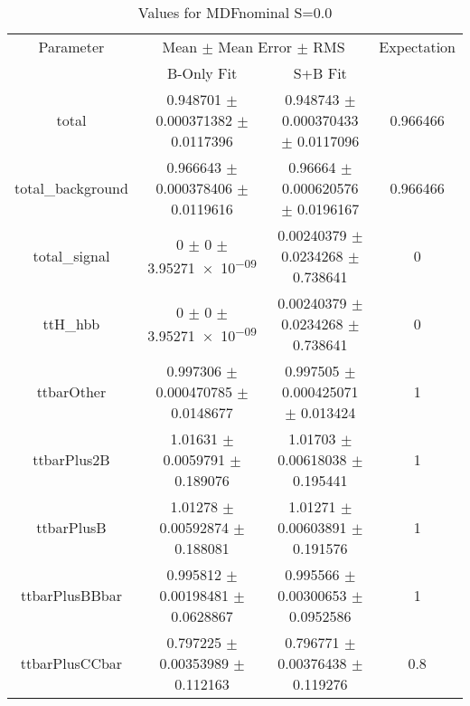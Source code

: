 \begin{table}
\centering
\caption{Values for MDFnominal S=0.0}
\begin{tabular}{cccc}
\toprule
Parameter & \multicolumn{2}{c}{Mean $\pm$ Mean Error $\pm$ RMS} & Expectation\\
 & B-Only Fit & S+B Fit & \\
\midrule
total & \num{0.948701} $\pm$ \num{0.000371382} $\pm$ \num{0.0117396} & \num{0.948743} $\pm$ \num{0.000370433} $\pm$ \num{0.0117096} & \num{0.966466}\\
total\_background & \num{0.966643} $\pm$ \num{0.000378406} $\pm$ \num{0.0119616} & \num{0.96664} $\pm$ \num{0.000620576} $\pm$ \num{0.0196167} & \num{0.966466}\\
total\_signal & \num{0} $\pm$ \num{0} $\pm$ \num{3.95271e-09} & \num{0.00240379} $\pm$ \num{0.0234268} $\pm$ \num{0.738641} & \num{0}\\
ttH\_hbb & \num{0} $\pm$ \num{0} $\pm$ \num{3.95271e-09} & \num{0.00240379} $\pm$ \num{0.0234268} $\pm$ \num{0.738641} & \num{0}\\
ttbarOther & \num{0.997306} $\pm$ \num{0.000470785} $\pm$ \num{0.0148677} & \num{0.997505} $\pm$ \num{0.000425071} $\pm$ \num{0.013424} & \num{1}\\
ttbarPlus2B & \num{1.01631} $\pm$ \num{0.0059791} $\pm$ \num{0.189076} & \num{1.01703} $\pm$ \num{0.00618038} $\pm$ \num{0.195441} & \num{1}\\
ttbarPlusB & \num{1.01278} $\pm$ \num{0.00592874} $\pm$ \num{0.188081} & \num{1.01271} $\pm$ \num{0.00603891} $\pm$ \num{0.191576} & \num{1}\\
ttbarPlusBBbar & \num{0.995812} $\pm$ \num{0.00198481} $\pm$ \num{0.0628867} & \num{0.995566} $\pm$ \num{0.00300653} $\pm$ \num{0.0952586} & \num{1}\\
ttbarPlusCCbar & \num{0.797225} $\pm$ \num{0.00353989} $\pm$ \num{0.112163} & \num{0.796771} $\pm$ \num{0.00376438} $\pm$ \num{0.119276} & \num{0.8}\\
\bottomrule
\end{tabular}
\end{table}